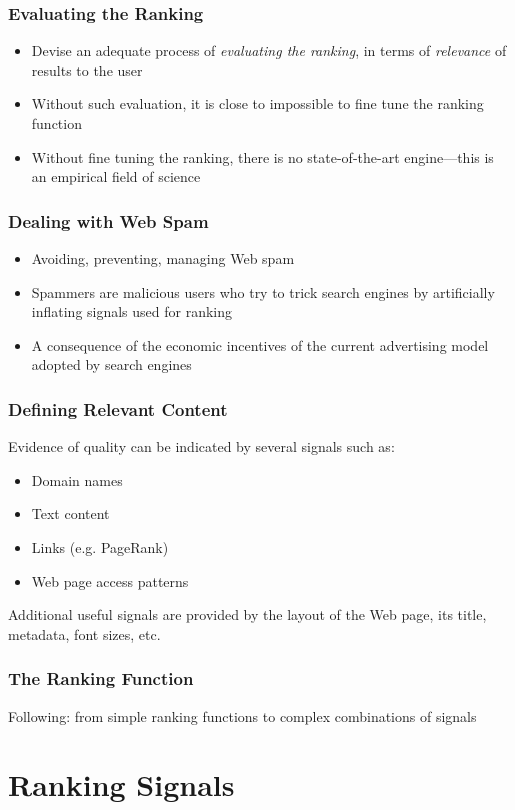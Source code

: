 \documentclass{beamer}
\begin{document}
\begin{frame}
    \frametitle{Evaluating the Ranking}
    \begin{itemize}
    \item Devise an adequate process of \emph{evaluating the ranking}, in terms
        of \emph{relevance} of results to the user
    \item Without such evaluation, it is close to impossible to fine tune the
        ranking function
    \item Without fine tuning the ranking, there is no state-of-the-art
        engine---this is an empirical field of science
    \end{itemize}
\end{frame}

\begin{frame}
    \frametitle{Dealing with Web Spam}
    \begin{itemize}
    \item Avoiding, preventing, managing Web spam
    \item Spammers are malicious users who try to trick search engines by
        artificially inflating signals used for ranking
    \item A consequence of the economic incentives of the current advertising
        model adopted by search engines
    \end{itemize}
\end{frame}

\begin{frame}
    \frametitle{Defining Relevant Content}
    Evidence of quality can be indicated by several signals such as:
    \begin{itemize}
    \item Domain names
    \item Text content
    \item Links (e.g. PageRank)
    \item Web page access patterns
    \end{itemize}
    Additional useful signals are provided by the layout of the Web page, its
    title, metadata, font sizes, etc.
\end{frame}

\begin{frame}
    \frametitle{The Ranking Function}
    Following: from simple ranking functions to complex combinations of signals
\end{frame}

\section{Ranking Signals}
\end{document}
